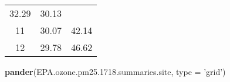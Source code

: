 \documentclass[]{article}
\newenvironment{Shaded}{\begin{snugshade}}{\end{snugshade}}
\newcommand{\KeywordTok}[1]{\textcolor[rgb]{0.13,0.29,0.53}{\textbf{#1}}}
\newcommand{\DataTypeTok}[1]{\textcolor[rgb]{0.13,0.29,0.53}{#1}}
\newcommand{\FloatTok}[1]{\textcolor[rgb]{0.00,0.00,0.81}{#1}}
\newcommand{\StringTok}[1]{\textcolor[rgb]{0.31,0.60,0.02}{#1}}
\newcommand{\NormalTok}[1]{#1}
\begin{document}
\begin{longtable}[]{@{}ccc@{}}
\begin{minipage}[t]{0.32\columnwidth}
32.29\strut
\end{minipage} & \begin{minipage}[t]{0.32\columnwidth}\centering\strut
30.13\strut
\end{minipage}\tabularnewline
\begin{minipage}[t]{0.10\columnwidth}\centering\strut
11\strut
\end{minipage} & \begin{minipage}[t]{0.32\columnwidth}\centering\strut
30.07\strut
\end{minipage} & \begin{minipage}[t]{0.32\columnwidth}\centering\strut
42.14\strut
\end{minipage}\tabularnewline
\begin{minipage}[t]{0.10\columnwidth}\centering\strut
12\strut
\end{minipage} & \begin{minipage}[t]{0.32\columnwidth}\centering\strut
29.78\strut
\end{minipage} & \begin{minipage}[t]{0.32\columnwidth}\centering\strut
46.62\strut
\end{minipage}\tabularnewline
\bottomrule
\end{longtable}

\begin{Shaded}
\begin{Highlighting}[]
\KeywordTok{pander}\NormalTok{(EPA.ozone.pm25.}\FloatTok{1718.}\NormalTok{summaries.site, }\DataTypeTok{type =} \StringTok{'grid'}\NormalTok{)}
\end{Highlighting}
\end{Shaded}
\end{document}
